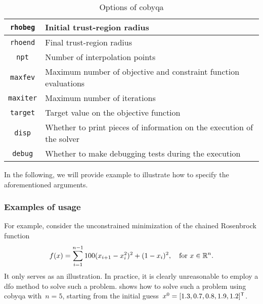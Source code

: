 \begin{table}[ht]
    \caption{Options of \gls{cobyqa}}
    \label{tab:cobyqa-options}
    \centering
    \begin{tabularx}{\textwidth}{cX}
        \toprule
        \texttt{rhobeg}     & Initial trust-region radius\\
        \midrule
        \texttt{rhoend}     & Final trust-region radius\\
        \midrule
        \texttt{npt}        & Number of interpolation points\\
        \midrule
        \texttt{maxfev}     & Maximum number of objective and constraint function evaluations\\
        \midrule
        \texttt{maxiter}    & Maximum number of iterations\\
        \midrule
        \texttt{target}     & Target value on the objective function\\
        \midrule
        \texttt{disp}       & Whether to print pieces of information on the execution of the solver\\
        \midrule
        \texttt{debug}      & Whether to make debugging tests during the execution\\
        \bottomrule
    \end{tabularx}
\end{table}

In the following, we will provide example to illustrate how to specify the aforementioned arguments.

\subsubsection{Examples of usage}

For example, consider the unconstrained minimization of the chained Rosenbrock function
\begin{equation*}
    f(x) = \sum_{i = 1}^{n - 1} 100(x_{i + 1} - x_i^2)^2 + (1 - x_i)^2, \quad \text{for~$x \in \mathbb{R}^n$.}
\end{equation*}
It only serves as an illustration.
In practice, it is clearly unreasonable to employ a \gls{dfo} method to solve such a problem.
 shows how to solve such a problem using \gls{cobyqa} with~$n = 5$, starting from the initial guess~$\iter[0] = [1.3, 0.7, 0.8, 1.9, 1.2]^{\T}$.

